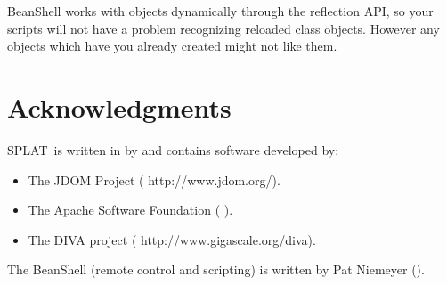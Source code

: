 \documentclass[twoside,11pt,nolof]{starlink}
\providecommand{\SPLAT}{\textsf{SPLAT}}
\begin{document}
BeanShell works with objects dynamically through the reflection API,
so your scripts will not have a problem recognizing reloaded class
objects.  However any objects which have you already created might not
like them.

\section{Acknowledgments}

\SPLAT\ is written in
 by
 and
contains software developed by:
\begin{itemize}
\item The JDOM Project (
                        {http://www.jdom.org/}).
\item The Apache Software Foundation
      ( ).
\item The DIVA project
      (
                         {http://www.gigascale.org/diva}).  
\end{itemize}

The BeanShell (remote control and scripting) is written by Pat
Niemeyer ().
\end{document}

